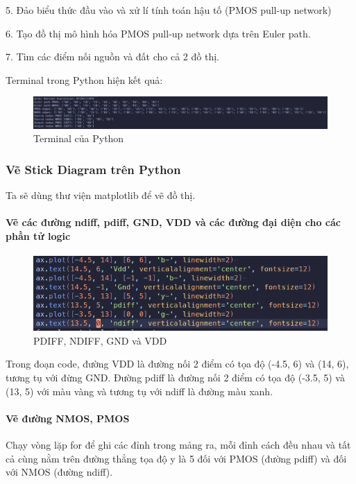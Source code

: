 \documentclass[a4paper,12pt]{article}
\begin{document}
5. Đảo biểu thức đầu vào và xử lí tính toán hậu tố (PMOS pull-up network)

6. Tạo đồ thị mô hình hóa PMOS pull-up network dựa trên Euler path.

7. Tìm các điểm nối nguồn và đất cho cả 2 đồ thị.

Terminal trong Python hiện kết quả:

\begin{figure}[H]
    \centering  
    \includegraphics[width=1\textwidth]{../PNG/Terminal_Python.png}
    \caption{Terminal của Python}
    \label{fig:Ter_Py}
\end{figure}
\subsubsection{Vẽ Stick Diagram trên Python}
Ta sẽ dùng thư viện matplotlib để vẽ đồ thị.

\paragraph{Vẽ các đường ndiff, pdiff, GND, VDD và các đường đại diện cho các phần tử logic}
\begin{figure}[H]
    \centering  
    \includegraphics[width=1\textwidth]{../PNG/pdiff_mm.png}
    \caption{PDIFF, NDIFF, GND và VDD}
    \label{fig:PDIFF_MM}
\end{figure}
Trong đoạn code, đường VDD là đường nối 2 điểm có tọa độ (-4.5, 6) và (14, 6),
tương tụ với đừng GND. Đường pdiff là đường nối 2 điểm có tọa độ (-3.5, 5) và (13, 5) với màu vàng
và tương tụ với ndiff là đường màu xanh.

\paragraph{Vẽ đường NMOS, PMOS}

Chạy vòng lặp for để ghi các đỉnh trong mảng ra, mỗi đỉnh cách đều nhau và tất cả cùng nằm trên 
đường thẳng tọa độ y là 5 đối với PMOS (đường pdiff) và đối với NMOS (đường ndiff).
\end{document}
